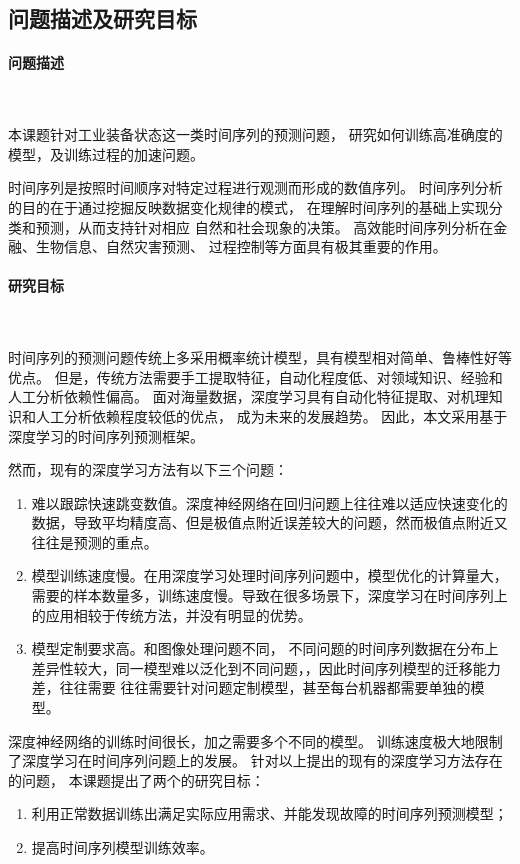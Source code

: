   \subsection{问题描述及研究目标}
  
  \paragraph{问题描述}~{}

  本课题针对工业装备状态这一类时间序列的预测问题，
  研究如何训练高准确度的模型，及训练过程的加速问题。

    时间序列是按照时间顺序对特定过程进行观测而形成的数值序列。
  时间序列分析的目的在于通过挖掘反映数据变化规律的模式，
  在理解时间序列的基础上实现分类和预测，从而支持针对相应
  自然和社会现象的决策。
  高效能时间序列分析在金融、生物信息、自然灾害预测、
  过程控制等方面具有极其重要的作用。

    
  \paragraph{研究目标}~{}\label{goal}

    时间序列的预测问题传统上多采用概率统计模型，具有模型相对简单、鲁棒性好等优点。
    但是，传统方法需要手工提取特征，自动化程度低、对领域知识、经验和人工分析依赖性偏高。
    面对海量数据，深度学习具有自动化特征提取、对机理知识和人工分析依赖程度较低的优点，
    成为未来的发展趋势。
    因此，本文采用基于深度学习的时间序列预测框架。

    然而，现有的深度学习方法有以下三个问题：
    \begin{enumerate}
      \item 难以跟踪快速跳变数值。深度神经网络在回归问题上往往难以适应快速变化的数据，导致平均精度高、但是极值点附近误差较大的问题，然而极值点附近又往往是预测的重点。
      \item 模型训练速度慢。在用深度学习处理时间序列问题中，模型优化的计算量大，需要的样本数量多，训练速度慢。导致在很多场景下，深度学习在时间序列上的应用相较于传统方法，并没有明显的优势。
      \item 模型定制要求高。和图像处理问题不同，
      不同问题的时间序列数据在分布上差异性较大，同一模型难以泛化到不同问题，\cite{lebedev2018speeding}，因此时间序列模型的迁移能力差，往往需要      往往需要针对问题定制模型，甚至每台机器都需要单独的模型。
    \end{enumerate}

    深度神经网络的训练时间很长，加之需要多个不同的模型。
    训练速度极大地限制了深度学习在时间序列问题上的发展。
    针对以上提出的现有的深度学习方法存在的问题，
    本课题提出了两个的研究目标：
    \begin{enumerate}[(1)]
      \item 利用正常数据训练出满足实际应用需求、并能发现故障的时间序列预测模型；
      \item 提高时间序列模型训练效率。
    \end{enumerate}


